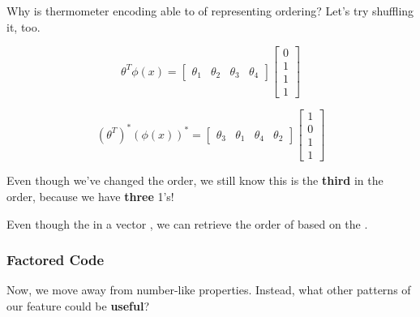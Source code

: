                 Why is thermometer encoding able to of representing ordering? Let's try shuffling it, too.

                \begin{equation}
                    \theta^T \phi(x) = 
                    \begin{bmatrix}
                        \theta_1 & \theta_2 & \theta_3 & \theta_4
                    \end{bmatrix}
                    \begin{bmatrix}
                        0\\1\\1\\1
                    \end{bmatrix}
                \end{equation}

                \begin{equation}
                    (\theta^T)^* (\phi(x))^* = 
                    \begin{bmatrix}
                        \theta_3 & \theta_1 & \theta_4 & \theta_2
                    \end{bmatrix}
                    \begin{bmatrix}
                        1 \\ 0 \\ 1 \\ 1
                    \end{bmatrix}
                \end{equation}

                Even though we've changed the order, we still know this is the \textbf{third} in the order, because we have \textbf{three} 1's!\\

                \begin{concept}
                    Even though the  in a vector , we can retrieve the order of  based on the .
                \end{concept}
            
            \subsecdiv
            \subsubsection{Factored Code}

                Now, we move away from number-like properties. Instead, what other patterns of our feature could be \textbf{useful}?

